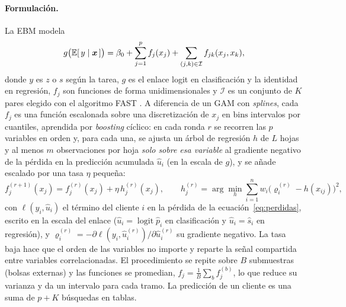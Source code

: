 \paragraph{Formulación.}
La EBM modela
\begin{equation}
  g\big(\mathbb{E}[\,y \mid \bm{x}\,]\big) = \beta_0 + \sum_{j=1}^{p} f_j(x_j) + \sum_{(j,k) \in \mathcal{I}} f_{jk}(x_j, x_k),
  \label{eq:ebm}
\end{equation}
donde $y$ es $z$ o $s$ según la tarea, $g$ es el enlace logit en clasificación y la identidad en regresión,
$f_j$ son funciones de forma unidimensionales y $\mathcal{I}$ es un conjunto de $K$ pares elegido con el
algoritmo FAST \citep{lou2013ga2m}. A diferencia de un GAM con \emph{splines}, cada $f_j$ es una función
escalonada sobre una discretización de $x_j$ en $\mathrm{bins}$ intervalos por cuantiles, aprendida por
\emph{boosting} cíclico: en cada ronda $r$ se recorren las $p$ variables en orden y, para cada una, se ajusta
un árbol de regresión $h$ de $L$ hojas y al menos $m$ observaciones por hoja \emph{solo sobre esa variable} al
gradiente negativo de la pérdida en la predicción acumulada $\hat{u}_i$ (en la escala de $g$), y se añade
escalado por una tasa $\eta$ pequeña:
\begin{equation}
  f_j^{(r+1)}(x_j) = f_j^{(r)}(x_j) + \eta\, h_j^{(r)}(x_j),
  \qquad
  h_j^{(r)} = \arg\min_{h} \sum_{i=1}^{n} w_i \big( \varrho_i^{(r)} - h(x_{ij}) \big)^2,
  \label{eq:boosting}
\end{equation}
con $\ell(y_i, \hat{u}_i)$ el término del cliente $i$ en la pérdida de la ecuación~\eqref{eq:perdidas}, escrito
en la escala del enlace ($\hat{u}_i = \operatorname{logit} \hat{p}_i$ en clasificación y $\hat{u}_i = \hat{s}_i$ en
regresión), y $\varrho_i^{(r)} = -\partial \ell(y_i, \hat{u}_i^{(r)}) / \partial \hat{u}_i^{(r)}$ su gradiente
negativo. La tasa baja hace que el orden de las variables no importe y reparte la señal compartida entre variables
correlacionadas. El procedimiento se repite sobre $B$ submuestras (bolsas externas) y las funciones se
promedian, $f_j = \frac{1}{B}\sum_b f_j^{(b)}$, lo que reduce su varianza y da un intervalo para cada tramo.
La predicción de un cliente es una suma de $p + K$ búsquedas en tablas.

